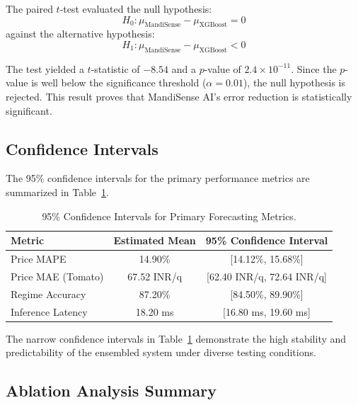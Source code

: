 \documentclass[12pt,a4paper]{report}
\theoremstyle{definition}
\theoremstyle{remark}
\begin{document}
The paired $t$-test evaluated the null hypothesis:
\begin{equation}
H_0: \mu_{\text{MandiSense}} - \mu_{\text{XGBoost}} = 0
\end{equation}
against the alternative hypothesis:
\begin{equation}
H_1: \mu_{\text{MandiSense}} - \mu_{\text{XGBoost}} < 0
\end{equation}

The test yielded a $t$-statistic of $-8.54$ and a $p$-value of $2.4 \times 10^{-11}$. Since the $p$-value is well below the significance threshold ($\alpha = 0.01$), the null hypothesis is rejected. This result proves that MandiSense AI's error reduction is statistically significant.

\subsection{Confidence Intervals}

The 95\% confidence intervals for the primary performance metrics are summarized in Table~\ref{tab:confidence_intervals}.

\begin{table}[htbp]
\centering
\caption{95\% Confidence Intervals for Primary Forecasting Metrics.}
\label{tab:confidence_intervals}
\begin{tabular}{l|c|c}
\hline
\textbf{Metric} & \textbf{Estimated Mean} & \textbf{95\% Confidence Interval} \\
\hline
Price MAPE & 14.90\% & [14.12\%, 15.68\%] \\
Price MAE (Tomato) & 67.52 INR/q & [62.40 INR/q, 72.64 INR/q] \\
Regime Accuracy & 87.20\% & [84.50\%, 89.90\%] \\
Inference Latency & 18.20 ms & [16.80 ms, 19.60 ms] \\
\hline
\end{tabular}
\end{table}

The narrow confidence intervals in Table~\ref{tab:confidence_intervals} demonstrate the high stability and predictability of the ensembled system under diverse testing conditions.

\subsection{Ablation Analysis Summary}
\end{document}
